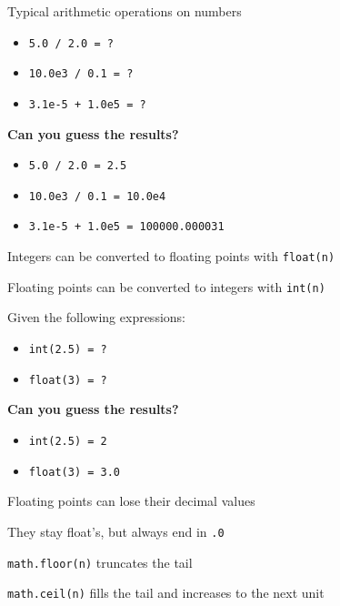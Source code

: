 \documentclass{beamer}
\begin{document}
\begin{slide}{
\item Typical arithmetic operations on numbers
\begin{itemize}
\item \texttt{5.0 / 2.0 = ?} 
\item \texttt{10.0e3 / 0.1 = ?}
\item \texttt{3.1e-5 + 1.0e5 = ?}
\end{itemize}
\item \textbf{Can you guess the results?}
\pause
\begin{itemize}
\item \texttt{5.0 / 2.0 = 2.5}
\item \texttt{10.0e3 / 0.1 = 10.0e4}
\item \texttt{3.1e-5 + 1.0e5 = 100000.000031}
\end{itemize} 
}\end{slide}

\begin{slide}{
\item Integers can be converted to floating points with \texttt{float(n)}
\item Floating points can be converted to integers with \texttt{int(n)}
}\end{slide}

\begin{slide}{
\item Given the following expressions:
\begin{itemize}
\item \texttt{int(2.5) = ?}
\item \texttt{float(3) = ?}
\end{itemize}
\item \textbf{Can you guess the results?}
\pause
\begin{itemize}
\item \texttt{int(2.5) = 2}
\item \texttt{float(3) = 3.0}
\end{itemize}
}\end{slide}

\begin{slide}{
\item Floating points can lose their decimal values
\item They stay float's, but always end in \texttt{.0}
\item \texttt{math.floor(n)} truncates the tail
\item \texttt{math.ceil(n)} fills the tail and increases to the next unit
}\end{slide}
\end{document}
